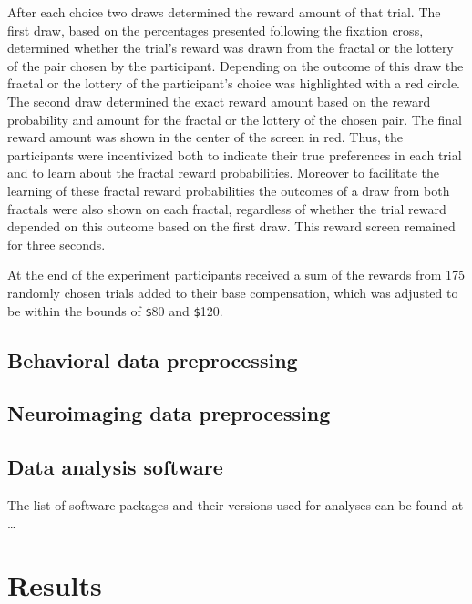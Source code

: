 \documentclass[
  english,
  man]{apa6}
\begin{document}
After each choice two draws determined the reward amount of that trial. The first draw, based on the percentages presented following the fixation cross, determined whether the trial's reward was drawn from the fractal or the lottery of the pair chosen by the participant. Depending on the outcome of this draw the fractal or the lottery of the participant's choice was highlighted with a red circle. The second draw determined the exact reward amount based on the reward probability and amount for the fractal or the lottery of the chosen pair. The final reward amount was shown in the center of the screen in red. Thus, the participants were incentivized both to indicate their true preferences in each trial and to learn about the fractal reward probabilities. Moreover to facilitate the learning of these fractal reward probabilities the outcomes of a draw from both fractals were also shown on each fractal, regardless of whether the trial reward depended on this outcome based on the first draw. This reward screen remained for three seconds.

At the end of the experiment participants received a sum of the rewards from 175 randomly chosen trials added to their base compensation, which was adjusted to be within the bounds of \texttt{\$}80 and \texttt{\$}120.

\hypertarget{behavioral-data-preprocessing}{%
\subsection{Behavioral data preprocessing}\label{behavioral-data-preprocessing}}

\hypertarget{neuroimaging-data-preprocessing}{%
\subsection{Neuroimaging data preprocessing}\label{neuroimaging-data-preprocessing}}

\hypertarget{data-analysis-software}{%
\subsection{Data analysis software}\label{data-analysis-software}}

The list of software packages and their versions used for analyses can be found at \ldots{}

\hypertarget{results}{%
\section{Results}\label{results}}
\end{document}
